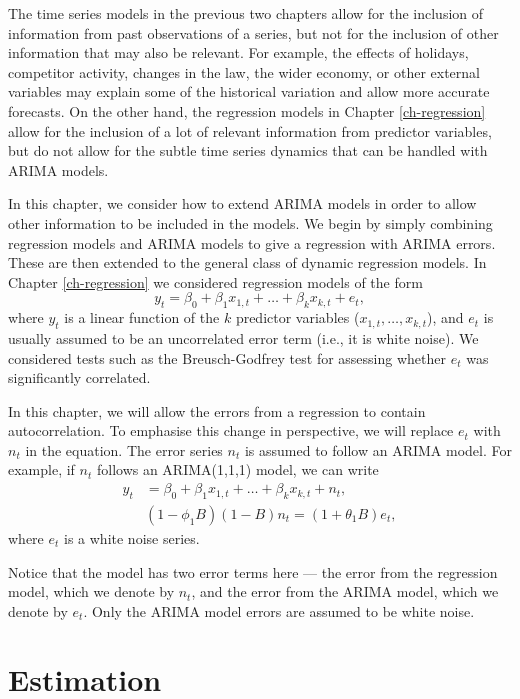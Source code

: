 \documentclass[]{book}
\begin{document}
The time series models in the previous two chapters allow for the inclusion of information from past observations of a series, but not for the inclusion of other information that may also be relevant. For example, the effects of holidays, competitor activity, changes in the law, the wider economy, or other external variables may explain some of the historical variation and allow more accurate forecasts. On the other hand, the regression models in Chapter \ref{ch-regression} allow for the inclusion of a lot of relevant information from predictor variables, but do not allow for the subtle time series dynamics that can be handled with ARIMA models.

In this chapter, we consider how to extend ARIMA models in order to allow other information to be included in the models. We begin by simply combining regression models and ARIMA models to give a regression with ARIMA errors. These are then extended to the general class of dynamic regression models. In Chapter \ref{ch-regression} we considered regression models of the form
\[
  y_t = \beta_0 + \beta_1 x_{1,t} + \dots + \beta_k x_{k,t} + e_t,
\]
where \(y_t\) is a linear function of the \(k\) predictor variables (\(x_{1,t},\dots,x_{k,t}\)), and \(e_t\) is usually assumed to be an uncorrelated error term (i.e., it is white noise). We considered tests such as the Breusch-Godfrey test for assessing whether \(e_t\) was significantly correlated.

In this chapter, we will allow the errors from a regression to contain autocorrelation. To emphasise this change in perspective, we will replace \(e_t\) with \(n_t\) in the equation. The error series \(n_t\) is assumed to follow an ARIMA model. For example, if \(n_t\) follows an ARIMA(1,1,1) model, we can write
\begin{align*}
  y_t &= \beta_0 + \beta_1 x_{1,t} + \dots + \beta_k x_{k,t} + n_t,\\
      & (1-\phi_1B)(1-B)n_t = (1+\theta_1B)e_t,
\end{align*}
where \(e_t\) is a white noise series.

Notice that the model has two error terms here --- the error from the regression model, which we denote by \(n_t\), and the error from the ARIMA model, which we denote by \(e_t\). Only the ARIMA model errors are assumed to be white noise.

\hypertarget{estimation}{%
\section{Estimation}\label{estimation}}
\end{document}
